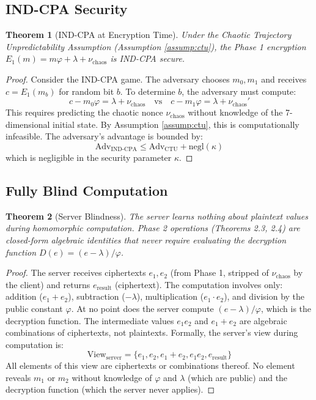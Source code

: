 \documentclass{article}
\newtheorem{theorem}{Theorem}[section]
\begin{document}
\subsection{IND-CPA Security}

\begin{theorem}[IND-CPA at Encryption Time]
Under the Chaotic Trajectory Unpredictability Assumption (Assumption \ref{assump:ctu}), the Phase 1 encryption $E_1(m) = m\varphi + \lambda + \nu_{\text{chaos}}$ is IND-CPA secure.
\end{theorem}

\begin{proof}
Consider the IND-CPA game. The adversary chooses $m_0, m_1$ and receives $c = E_1(m_b)$ for random bit $b$. To determine $b$, the adversary must compute:
\begin{equation}
c - m_0\varphi = \lambda + \nu_{\text{chaos}} \quad \text{vs} \quad c - m_1\varphi = \lambda + \nu_{\text{chaos}}'
\end{equation}
This requires predicting the chaotic nonce $\nu_{\text{chaos}}$ without knowledge of the 7-dimensional initial state. By Assumption \ref{assump:ctu}, this is computationally infeasible. The adversary's advantage is bounded by:
\begin{equation}
\text{Adv}_{\text{IND-CPA}} \leq \text{Adv}_{\text{CTU}} + \text{negl}(\kappa)
\end{equation}
which is negligible in the security parameter $\kappa$.
\end{proof}

\subsection{Fully Blind Computation}

\begin{theorem}[Server Blindness]
The server learns nothing about plaintext values during homomorphic computation. Phase 2 operations (Theorems 2.3, 2.4) are closed-form algebraic identities that never require evaluating the decryption function $D(e) = (e - \lambda)/\varphi$.
\end{theorem}

\begin{proof}
The server receives ciphertexts $e_1, e_2$ (from Phase 1, stripped of $\nu_{\text{chaos}}$ by the client) and returns $e_{\text{result}}$ (ciphertext). The computation involves only: addition ($e_1 + e_2$), subtraction ($-\lambda$), multiplication ($e_1 \cdot e_2$), and division by the public constant $\varphi$. At no point does the server compute $(e - \lambda)/\varphi$, which is the decryption function. The intermediate values $e_1 e_2$ and $e_1 + e_2$ are algebraic combinations of ciphertexts, not plaintexts. Formally, the server's view during computation is:
\begin{equation}
\text{View}_{\text{server}} = \{e_1, e_2, e_1 + e_2, e_1 e_2, e_{\text{result}}\}
\end{equation}
All elements of this view are ciphertexts or combinations thereof. No element reveals $m_1$ or $m_2$ without knowledge of $\varphi$ and $\lambda$ (which are public) and the decryption function (which the server never applies).
\end{proof}
\end{document}
